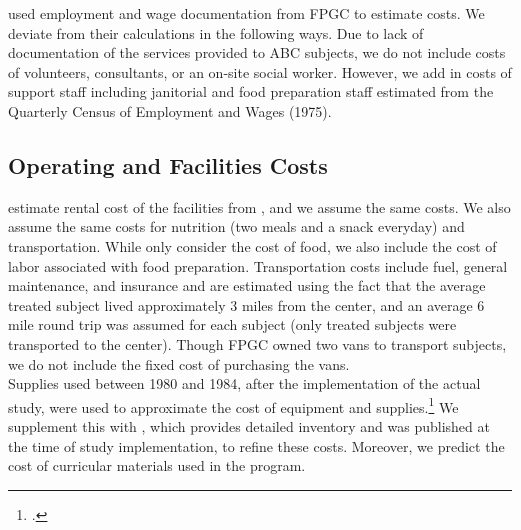 \noindent \cite{Barnett_Masse_2002_benefitcost} used employment and wage documentation from FPGC to estimate costs. We deviate from their calculations in the following ways. Due to lack of documentation of the services provided to ABC subjects, we do not include costs of volunteers, consultants, or an on-site social worker. However, we add in costs of support staff including janitorial and food preparation staff estimated from the Quarterly Census of Employment and Wages (1975). \\

\subsection{Operating and Facilities Costs}

\noindent \cite{Barnett_Masse_2002_benefitcost} estimate rental cost of the facilities from \cite{Helburn_1995_Childcare-Report}, and we assume the same costs. We also assume the same costs for nutrition (two meals and a snack everyday) and transportation. While \cite{Barnett_Masse_2002_benefitcost} only consider the cost of food, we also include the cost of labor associated with food preparation. Transportation costs include fuel, general maintenance, and insurance and are estimated using the fact that the average treated subject lived approximately 3 miles from the center, and an average 6 mile round trip was assumed for each subject (only treated subjects were transported to the center). Though FPGC owned two vans to transport subjects, we do not include the fixed cost of purchasing the vans. \\

\noindent Supplies used between 1980 and 1984, after the implementation of the actual study, were used to approximate the cost of equipment and supplies.\footnote{\citet{Barnett_Masse_2002_benefitcost}.} We supplement this with \cite{FPGC_Progress-Report_1973}, which provides detailed inventory and was published at the time of study  implementation, to refine these costs. Moreover, we predict the cost of curricular materials used in the program. \\


